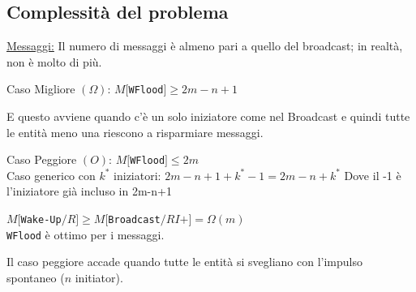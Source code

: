 \subsection{Complessità del problema}
\underline{Messaggi:}
Il numero di messaggi è almeno pari a quello del broadcast; in realtà, non è molto di più.
\begin{center}
  Caso Migliore $(\Omega)$: $M[$\texttt{WFlood}$] \geq 2m - n + 1$  \\
\end{center}
E questo avviene quando c'è un solo iniziatore come nel Broadcast e quindi tutte le entità meno una riescono a risparmiare messaggi.\\
\begin{center}
Caso Peggiore $(O)$: $M[$\texttt{WFlood}$] \leq 2m$\\ 
Caso generico con $k^*$ iniziatori: $2m-n+1 + k^* -1 = 2m-n+k^*$ 
Dove il -1 è l'iniziatore già incluso in 2m-n+1

$M[$\texttt{Wake-Up}$/R] \geq M[$\texttt{Broadcast}$/RI+] = \Omega(m)$\\
  \texttt{WFlood} è ottimo per i messaggi.
\end{center}
Il caso peggiore accade quando tutte le entità si svegliano con l'impulso spontaneo ($n$ initiator).

